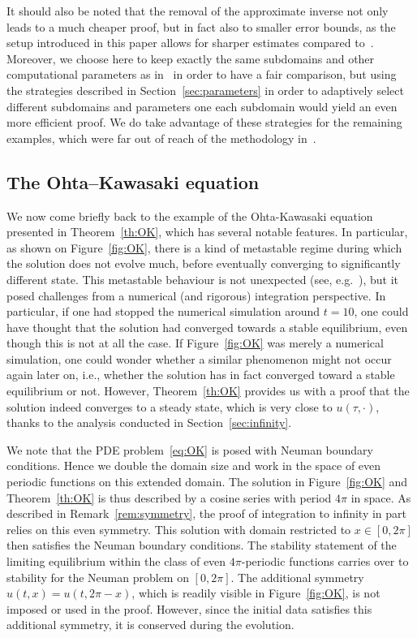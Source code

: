 \documentclass[10pt,a4paper]{article}
\theoremstyle{plain}
\newcommand{\1}{\mathbf{1}}
\begin{document}
It should also be noted that the removal of the approximate inverse not only leads to a much cheaper proof, but in fact also to smaller error bounds, as the setup introduced in this paper allows for sharper estimates compared to~\cite{BerBreShe24}. Moreover, we choose here to keep exactly the same subdomains and other computational parameters as in~\cite{BerBreShe24} in order to have a fair comparison, but using the strategies described in Section~\ref{sec:parameters} in order to adaptively select different subdomains and parameters one each subdomain would yield an even more efficient proof. We do take advantage of these strategies for the remaining examples, which were far out of reach of the methodology in~\cite{BerBreShe24}.

\subsection{The Ohta--Kawasaki equation}
\label{sec:OK}

We now come briefly back to the example of the Ohta-Kawasaki equation presented in Theorem~\ref{th:OK}, which has several notable features. In particular, as shown on Figure~\ref{fig:OK}, there is a kind of metastable regime during which the solution does not evolve much, before eventually converging to significantly different state. This metastable behaviour is not unexpected (see, e.g.~\cite{ChoMarWil11,CyrWan18,JohSanWan13,Wan16}), but it posed challenges from a numerical (and rigorous) integration perspective. In particular, if one had stopped the numerical simulation around $t=10$, one could have thought that the solution had converged towards a stable equilibrium, even though this is not at all the case. If Figure~\ref{fig:OK} was merely a numerical simulation, one could wonder whether a similar phenomenon might not occur again later on, i.e., whether the solution has in fact converged toward a stable equilibrium or not. However, Theorem~\ref{th:OK} provides us with a proof that the solution indeed converges to a steady state, which is very close to $u(\tau,\cdot)$, thanks to the analysis conducted in Section~\ref{sec:infinity}. 

We note that the PDE problem~\eqref{eq:OK} is posed with Neuman boundary conditions. Hence we double the domain size and work in the space of even periodic functions on this extended domain.
The solution in Figure~\ref{fig:OK} and Theorem~\ref{th:OK} is thus described by a cosine series with period $4\pi$ in space. As described in Remark~\ref{rem:symmetry}, the proof of integration to infinity in part relies on this even symmetry. This solution with domain restricted to $x\in[0,2\pi]$ then satisfies the Neuman boundary conditions. The stability statement of the limiting equilibrium within the class of even $4\pi$-periodic functions carries over to stability for the Neuman problem on $[0,2\pi]$. The additional symmetry $u(t,x)=u(t,2\pi-x)$, which is readily visible in Figure~\ref{fig:OK}, is not imposed or used in the proof. However, since the initial data satisfies this additional symmetry, it is conserved during the evolution.
\end{document}
